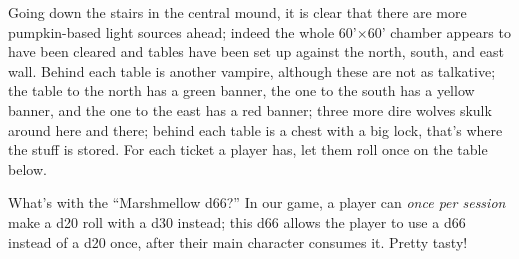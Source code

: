 Going down the stairs in the central mound, it is clear that there are more
pumpkin-based light sources ahead; indeed the whole 60'\(\times\)60' chamber
appears to have been cleared and tables have been set up against the north,
south, and east wall. Behind each table is another vampire, although these are
not as talkative; the table to the north has a green banner, the one to the
south has a yellow banner, and the one to the east has a red banner; three more
dire wolves skulk around here and there; behind each table is a chest with a
big lock, that's where the stuff is stored. For each ticket a player has, let
them roll once on the table below.

What's with the ``Marshmellow d66?'' In our game, a player can \emph{once per
session} make a d20 roll with a d30 instead; this d66 allows the player to use
a d66 instead of a d20 once, after their main character consumes it. Pretty tasty!

